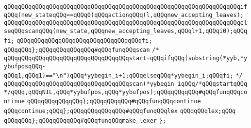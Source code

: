 \verb|qQQqqQQqqQQqqQQqqQQqqQQqqQQqqQQqqQQqqQQqqQQqqQQqqQQqqQQqqQQqqQQqqQQqifqQQq(new_stateqQQq==qQQq0)qQQqactionqQQq(l,qQQqnew_accepting_leaves);|\newline
\verb|qQQqqQQqqQQqqQQqqQQqqQQqqQQqqQQqqQQqqQQqqQQqqQQqqQQqqQQqqQQqqQQqqQQqelseqQQqscanqQQq(new_state,qQQqnew_accepting_leaves,qQQql+1,qQQqi0);qQQqfi;|\newline
\verb|qQQqqQQqqQQqqQQqqQQqqQQqqQQqqQQqqQQqfi;|\newline
\verb|qQQqqQQq};qQQqqQQqqQQqqQQq#qQQqfunqQQqscan|\newline
\verb|/*|\newline
\verb|qQQqqQQqqQQqqQQqqQQqqQQqqQQqqQQqqQQqstart=qQQqifqQQq(substring(*yyb,*yybufposqQQq-qQQq1,qQQq1)=="\n")qQQq*yybegin_i+1;qQQqelseqQQq*yybegin_i;qQQqfi;|\newline
\verb|*/|\newline
\verb|qQQqqQQqqQQqqQQqqQQqqQQqqQQqqQQqqQQqscan(*yybegin_iqQQq/*qQQqstartqQQq*/qQQq,qQQqNIL,qQQq*yybufpos,qQQq*yybufpos);qQQqqQQqqQQq#qQQqfunqQQqcontinue|\newline
\verb|qQQqqQQqqQQqqQQq};qQQqqQQqqQQq#qQQqfunqQQqcontinue|\newline
\verb|qQQqcontinue;qQQq};qQQqqQQqqQQqqQQq#qQQqfunqQQqlex|\newline
\verb|qQQqqQQqlex;qQQq|\newline
\verb|qQQqqQQq};qQQqqQQqqQQq#qQQqfunqQQqmake_lexer|\newline
\verb|};|\newline

